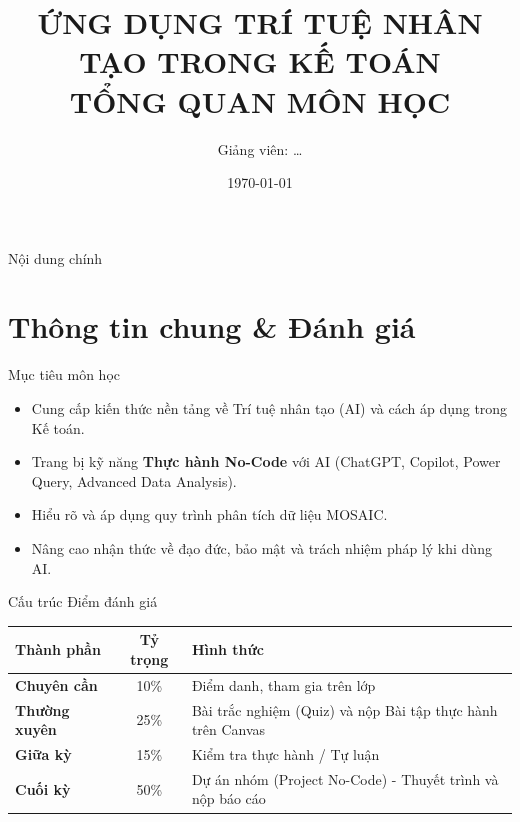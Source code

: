 \documentclass[aspectratio=169]{beamer}
\title[Tổng quan môn học]{ỨNG DỤNG TRÍ TUỆ NHÂN TẠO TRONG KẾ TOÁN \\ TỔNG QUAN MÔN HỌC}
\author{Giảng viên: \dots}
\institute{Đại học Đông Á}
\date{\today}
\begin{document}
\begin{frame}
    \titlepage
\end{frame}

\begin{frame}{Nội dung chính}
    \tableofcontents
\end{frame}

\section{Thông tin chung \& Đánh giá}
\begin{frame}{Mục tiêu môn học}
    \begin{itemize}
        \item Cung cấp kiến thức nền tảng về Trí tuệ nhân tạo (AI) và cách áp dụng trong Kế toán.
        \item Trang bị kỹ năng \textbf{Thực hành No-Code} với AI (ChatGPT, Copilot, Power Query, Advanced Data Analysis).
        \item Hiểu rõ và áp dụng quy trình phân tích dữ liệu MOSAIC.
        \item Nâng cao nhận thức về đạo đức, bảo mật và trách nhiệm pháp lý khi dùng AI.
    \end{itemize}
\end{frame}

\begin{frame}{Cấu trúc Điểm đánh giá}
    \begin{table}[]
        \centering
        \begin{tabular}{|l|c|p{7cm}|}
        \hline
        \textbf{Thành phần} & \textbf{Tỷ trọng} & \textbf{Hình thức} \\ \hline
        \textbf{Chuyên cần} & 10\% & Điểm danh, tham gia trên lớp \\ \hline
        \textbf{Thường xuyên} & 25\% & Bài trắc nghiệm (Quiz) và nộp Bài tập thực hành trên Canvas \\ \hline
        \textbf{Giữa kỳ} & 15\% & Kiểm tra thực hành / Tự luận \\ \hline
        \textbf{Cuối kỳ} & 50\% & Dự án nhóm (Project No-Code) - Thuyết trình và nộp báo cáo \\ \hline
        \end{tabular}
    \end{table}
\end{frame}
\end{document}
